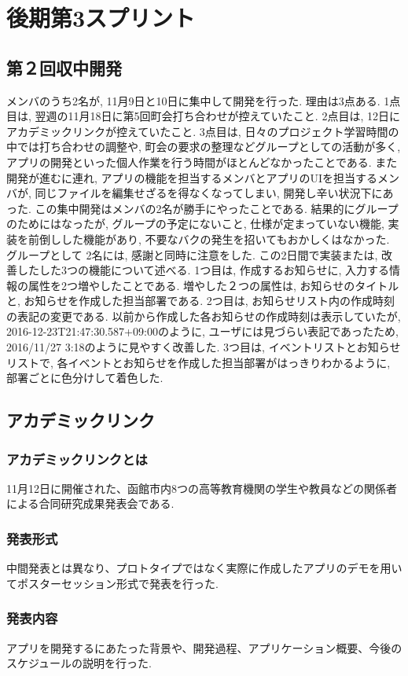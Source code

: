 \section{後期第3スプリント}
\subsection{第２回収中開発}
メンバのうち2名が, 11月9日と10日に集中して開発を行った. 理由は3点ある. 1点目は, 翌週の11月18日に第5回町会打ち合わせが控えていたこと.
2点目は, 12日にアカデミックリンクが控えていたこと. 3点目は, 日々のプロジェクト学習時間の中では打ち合わせの調整や, 町会の要求の整理などグループとしての活動が多く,
アプリの開発といった個人作業を行う時間がほとんどなかったことである. また開発が進むに連れ, アプリの機能を担当するメンバとアプリのUIを担当するメンバが, 同じファイルを編集せざるを得なくなってしまい,
開発し辛い状況下にあった. この集中開発はメンバの2名が勝手にやったことである. 結果的にグループのためにはなったが, グループの予定にないこと, 仕様が定まっていない機能, 実装を前倒しした機能があり,
不要なバクの発生を招いてもおかしくはなかった. グループとして 2名には, 感謝と同時に注意をした. この2日間で実装または, 改善したした3つの機能について述べる. 1つ目は, 作成するお知らせに,
入力する情報の属性を2つ増やしたことである. 増やした２つの属性は, お知らせのタイトルと, お知らせを作成した担当部署である. 2つ目は, お知らせリスト内の作成時刻の表記の変更である.
以前から作成した各お知らせの作成時刻は表示していたが, 2016-12-23T21:47:30.587+09:00のように, ユーザには見づらい表記であったため, 2016/11/27 3:18のように見やすく改善した.
3つ目は, イベントリストとお知らせリストで, 各イベントとお知らせを作成した担当部署がはっきりわかるように, 部署ごとに色分けして着色した.

\subsection{アカデミックリンク}
\subsubsection{アカデミックリンクとは}
11月12日に開催された、函館市内8つの高等教育機関の学生や教員などの関係者による合同研究成果発表会である.
\subsubsection{発表形式}
中間発表とは異なり、プロトタイプではなく実際に作成したアプリのデモを用いてポスターセッション形式で発表を行った.
\subsubsection{発表内容}
アプリを開発するにあたった背景や、開発過程、アプリケーション概要、今後のスケジュールの説明を行った.


